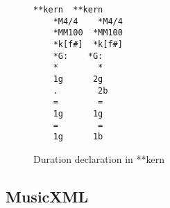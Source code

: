 \begin{figure}
  \begin{center}
    \begin{Verbatim}[fontfamily=courier, xleftmargin=\parindent]
	**kern	**kern
	*M4/4	 *M4/4
	*MM100	*MM100
	*k[f#]	*k[f#]
	*G:	   *G:
	*	     *
	1g	    2g
	.	     2b
	=	     =
	1g	    1g
	=	     =
	1g	    1b
    \end{Verbatim}
    \caption{Duration declaration in **kern}
    \label{fig:humdrumDuration}
  \end{center}
\end{figure}

\subsection{MusicXML}